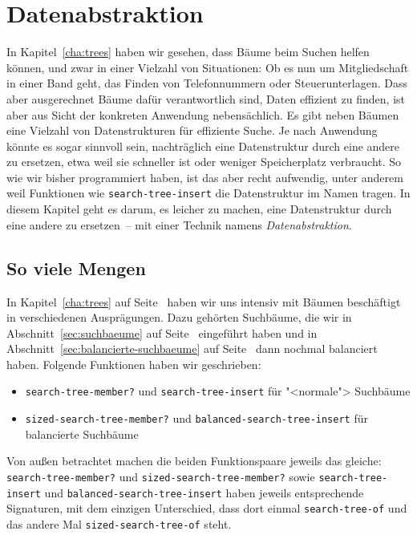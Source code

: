 
\chapter{Datenabstraktion}
\label{chap:datenabstraktion}


In Kapitel~\ref{cha:trees} haben wir gesehen, dass Bäume beim Suchen
helfen können, und zwar in einer Vielzahl von Situationen: Ob es nun
um Mitgliedschaft in einer Band geht, das Finden von Telefonnummern
oder Steuerunterlagen.  Dass aber ausgerechnet Bäume dafür
verantwortlich sind, Daten effizient zu finden, ist aber aus Sicht der
konkreten Anwendung nebensächlich.  Es gibt neben Bäumen eine Vielzahl
von Datenstrukturen für effiziente Suche.  Je nach Anwendung könnte es
sogar sinnvoll sein, nachträglich eine Datenstruktur durch eine andere
zu ersetzen, etwa weil sie schneller ist oder weniger Speicherplatz
verbraucht.  So wie wir bisher programmiert haben, ist das aber recht
aufwendig, unter anderem weil Funktionen wie
\lstinline{search-tree-insert} die Datenstruktur im Namen tragen.  In
diesem Kapitel geht es darum, es leicher zu machen, eine Datenstruktur
durch eine andere zu ersetzen~-- mit einer Technik namens
\textit{Datenabstraktion}.

\section{So viele Mengen}


In Kapitel~\ref{cha:trees} auf Seite~\pageref{cha:trees} haben wir uns
intensiv mit Bäumen beschäftigt in verschiedenen Ausprägungen.  Dazu
gehörten Suchbäume, die wir in Abschnitt~\ref{sec:suchbaeume} auf
Seite~\pageref{ref:sec:suchbaeume} eingeführt haben und in
Abschnitt~\ref{sec:balancierte-suchbaeume} auf
Seite~\pageref{sec:balancierte-suchbaeume} dann nochmal balanciert
haben.  Folgende Funktionen haben wir geschrieben:
%
\begin{itemize}
\item \lstinline{search-tree-member?} und
  \lstinline{search-tree-insert} für "<normale"> Suchbäume
\item \lstinline{sized-search-tree-member?} und
  \lstinline{balanced-search-tree-insert} für balancierte Suchbäume
\end{itemize}
%
Von außen betrachtet machen die beiden Funktionspaare jeweils das
gleiche: \lstinline{search-tree-member?} und
\lstinline{sized-search-tree-member?} sowie
\lstinline{search-tree-insert} und
\lstinline{balanced-search-tree-insert} haben jeweils entsprechende
Signaturen, mit dem einzigen Unterschied, dass dort einmal
\lstinline{search-tree-of} und das andere Mal
\lstinline{sized-search-tree-of} steht.

